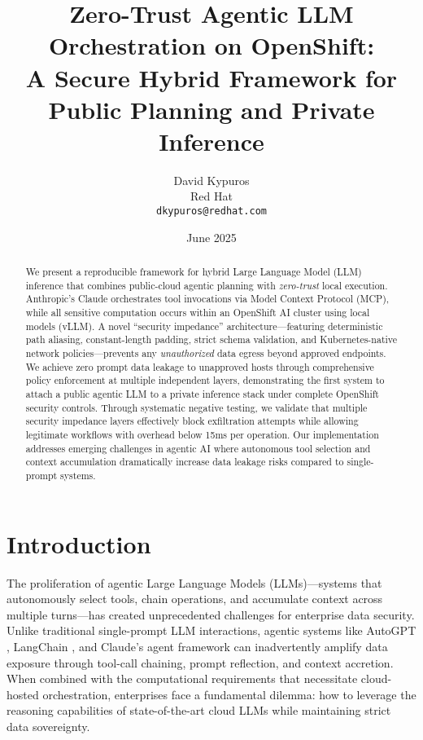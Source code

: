 \documentclass[11pt]{article}
\title{\bfseries
Zero-Trust Agentic LLM Orchestration on OpenShift:\\
A Secure Hybrid Framework for Public Planning and Private Inference}
\author{David Kypuros\\[2pt]
Red Hat\\
\texttt{dkypuros@redhat.com}}
\date{June 2025}
\begin{document}
\maketitle

\begin{abstract}
We present a reproducible framework for hybrid Large Language Model (LLM) inference that combines public-cloud agentic planning with \emph{zero-trust} local execution. Anthropic's Claude orchestrates tool invocations via Model Context Protocol (MCP), while all sensitive computation occurs within an OpenShift AI cluster using local models (vLLM). A novel ``security impedance'' architecture—featuring deterministic path aliasing, constant-length padding, strict schema validation, and Kubernetes-native network policies—prevents any \emph{unauthorized} data egress beyond approved endpoints. We achieve zero prompt data leakage to unapproved hosts through comprehensive policy enforcement at multiple independent layers, demonstrating the first system to attach a public agentic LLM to a private inference stack under complete OpenShift security controls. Through systematic negative testing, we validate that multiple security impedance layers effectively block exfiltration attempts while allowing legitimate workflows with overhead below 15ms per operation. Our implementation addresses emerging challenges in agentic AI where autonomous tool selection and context accumulation dramatically increase data leakage risks compared to single-prompt systems.
\end{abstract}

\section{Introduction}

The proliferation of agentic Large Language Models (LLMs)—systems that autonomously select tools, chain operations, and accumulate context across multiple turns—has created unprecedented challenges for enterprise data security. Unlike traditional single-prompt LLM interactions, agentic systems like AutoGPT \cite{autogpt2023}, LangChain \cite{langchain2024}, and Claude's agent framework can inadvertently amplify data exposure through tool-call chaining, prompt reflection, and context accretion. When combined with the computational requirements that necessitate cloud-hosted orchestration, enterprises face a fundamental dilemma: how to leverage the reasoning capabilities of state-of-the-art cloud LLMs while maintaining strict data sovereignty.
\end{document}
